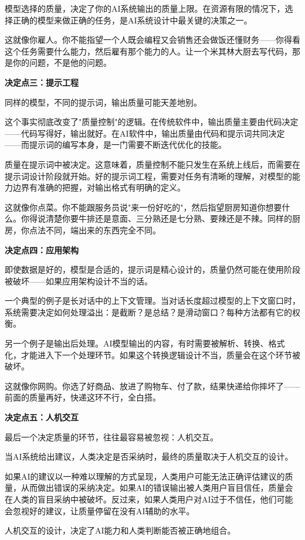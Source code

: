 模型选择的质量，决定了你的AI系统输出的质量上限。在资源有限的情况下，选择正确的模型来做正确的任务，是AI系统设计中最关键的决策之一。

这就像你雇人。你不能指望一个人既会编程又会销售还会做饭还懂财务——你得看这个任务需要什么能力，然后雇有那个能力的人。让一个米其林大厨去写代码，那是你的问题，不是他的问题。

\textbf{决定点三：提示工程}

同样的模型，不同的提示词，输出质量可能天差地别。

这个事实彻底改变了"质量控制"的逻辑。在传统软件中，输出质量主要由代码决定——代码写得好，输出就好。在AI软件中，输出质量由代码和提示词共同决定——而提示词的编写本身，是一门需要不断迭代优化的技能。

质量在提示词中被决定。这意味着，质量控制不能只发生在系统上线后，而需要在提示词设计阶段就开始。好的提示词工程，需要对任务有清晰的理解，对模型的能力边界有准确的把握，对输出格式有明确的定义。

这就像你点菜。你不能跟服务员说"来一份好吃的"，然后指望厨房知道你想要什么。你得说清楚你要牛排还是意面、三分熟还是七分熟、要辣还是不辣。同样的厨房，你点法不同，端出来的东西完全不同。

\textbf{决定点四：应用架构}

即使数据是好的，模型是合适的，提示词是精心设计的，质量仍然可能在使用阶段被破坏——如果应用架构设计不当的话。

一个典型的例子是长对话中的上下文管理。当对话长度超过模型的上下文窗口时，系统需要决定如何处理溢出：是截断？是总结？是滑动窗口？每种方法都有它的权衡。

另一个例子是输出后处理。AI模型输出的内容，有时需要被解析、转换、格式化，才能进入下一个处理环节。如果这个转换逻辑设计不当，质量会在这个环节被破坏。

这就像你网购。你选了好商品、放进了购物车、付了款，结果快递给你摔坏了——前面的质量再好，快递这环不行，全白搭。

\textbf{决定点五：人机交互}

最后一个决定质量的环节，往往最容易被忽视：人机交互。

当AI系统给出建议，人类决定是否采纳时，最终的质量取决于人机交互的设计。

如果AI的建议以一种难以理解的方式呈现，人类用户可能无法正确评估建议的质量，从而做出错误的采纳决定。如果AI的错误输出被人类用户盲目信任，质量会在人类的盲目采纳中被破坏。反过来，如果人类用户对AI过于不信任，他们可能会忽视好的建议，让质量停留在没有AI辅助的水平。

人机交互的设计，决定了AI能力和人类判断能否被正确地组合。

